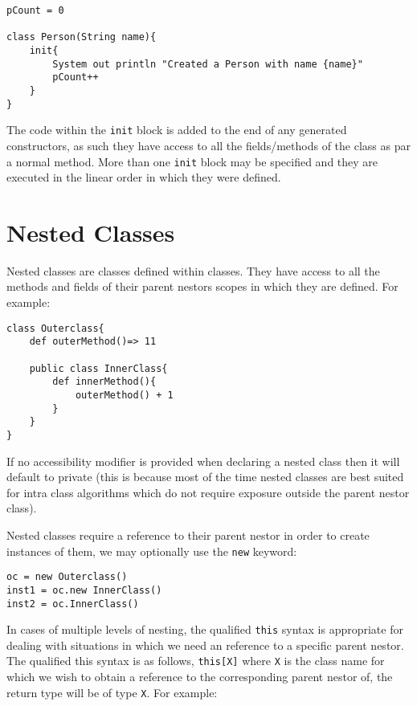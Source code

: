 \documentclass[conc-doc]{subfiles}
\begin{document}
\begin{lstlisting}
pCount = 0

class Person(String name){
	init{
		System out println "Created a Person with name {name}"
		pCount++
	}
}
\end{lstlisting}

The code within the \lstinline{init} block is added to the end of any generated constructors, as such they have access to all the fields/methods of the class as par a normal method. More than one \lstinline{init} block may be specified and they are executed in the linear order in which they were defined.

\section{Nested Classes}
Nested classes are classes defined within classes. They have access to all the methods and fields of their parent nestors scopes in which they are defined. For example:

\begin{lstlisting}
class Outerclass{
	def outerMethod()=> 11
	
	public class InnerClass{
		def innerMethod(){
			outerMethod() + 1
		}
	}
}
\end{lstlisting}

If no accessibility modifier is provided when declaring a nested class then it will default to private (this is because most of the time nested classes are best suited for intra class algorithms which do not require exposure outside the parent nestor class).

Nested classes require a reference to their parent nestor in order to create instances of them, we may optionally use the \lstinline{new} keyword:

\begin{lstlisting}
oc = new Outerclass()
inst1 = oc.new InnerClass()
inst2 = oc.InnerClass()
\end{lstlisting}

In cases of multiple levels of nesting, the qualified \lstinline{this} syntax is appropriate for dealing with situations in which we need an reference to a specific parent nestor. The qualified this syntax is as follows, \lstinline{this[X]} where \lstinline{X} is the class name for which we wish to obtain a reference to the corresponding parent nestor of, the return type will be of type \lstinline{X}. For example:
\end{document}
